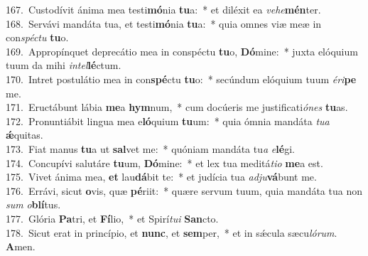 {167.~}Custodívit ánima mea testi\textbf{mó}nia \textbf{tu}a:~* et diléxit ea \textit{ve}\textit{he}\textbf{mén}ter.\\
{168.~}Servávi mandáta tua, et testi\textbf{mó}nia \textbf{tu}a:~* quia omnes viæ meæ in con\textit{spé}\textit{ctu} \textbf{tu}o.\\
{169.~}Appropínquet deprecátio mea in conspéctu \textbf{tu}o, \textbf{Dó}mine:~* juxta elóquium tuum da mihi \textit{in}\textit{tel}\textbf{lé}ctum.\\
{170.~}Intret postulátio mea in con\textbf{spé}ctu \textbf{tu}o:~* secúndum elóquium tuum \textit{é}\textit{ri}\textbf{pe} me.\\
{171.~}Eructábunt lábia \textbf{me}a \textbf{hym}num,~* cum docúeris me justificati\textit{ó}\textit{nes} \textbf{tu}as.\\
{172.~}Pronuntiábit lingua mea e\textbf{ló}quium \textbf{tu}um:~* quia ómnia mandáta \textit{tu}\textit{a} \textbf{ǽ}quitas.\\
{173.~}Fiat manus \textbf{tu}a ut \textbf{sal}vet me:~* quóniam mandáta tu\textit{a} \textit{e}\textbf{lé}gi.\\
{174.~}Concupívi salutáre \textbf{tu}um, \textbf{Dó}mine:~* et lex tua meditá\textit{ti}\textit{o} \textbf{me}a est.\\
{175.~}Vivet ánima mea, \textbf{et} lau\textbf{dá}bit te:~* et judícia tua \textit{ad}\textit{ju}\textbf{vá}bunt me.\\
{176.~}Errávi, sicut \textbf{o}vis, quæ \textbf{pé}riit:~* quære servum tuum, quia mandáta tua non \textit{sum} \textit{o}\textbf{blí}tus.\\
{177.~}Glória \textbf{Pa}tri, et \textbf{Fí}lio,~* et Spirí\textit{tu}\textit{i} \textbf{San}cto.\\
{178.~}Sicut erat in princípio, et \textbf{nunc}, et \textbf{sem}per,~* et in sǽcula sæcu\textit{ló}\textit{rum}. \textbf{A}men.\\
